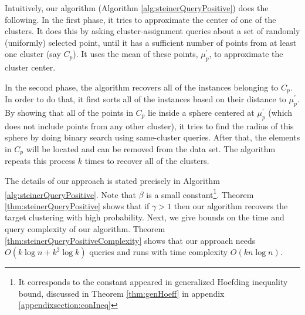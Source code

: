 \documentclass{article}
\begin{document}
Intuitively, our algorithm (Algorithm  \ref{alg:steinerQueryPositive}) does the following. In the first phase, it tries to approximate the center of one of the clusters. It does this by asking cluster-assignment queries about a set of randomly (uniformly) selected point, until it has a sufficient number of points from at least one cluster (say $C_p$). It uses the mean of these points, $\mu_p^\prime$, to approximate the cluster center. 

In the second phase, the algorithm recovers all of the instances belonging to $C_p$. In order to do that, it first sorts all of the instances based on their distance to $\mu_p^\prime$. By showing that all of the points in $C_p$ lie inside a sphere centered at $\mu_p^\prime$ (which does not include points from any other cluster), it tries to find the radius of this sphere by doing binary search using same-cluster queries. After that, the elements in $C_p$ will be located and can be removed from the data set. The algorithm repeats this process $k$ times to recover all of the clusters.



The details of our approach is stated precisely in Algorithm \ref{alg:steinerQueryPositive}. Note that $\beta$ is a small constant\footnote{It corresponds to the constant appeared in generalized Hoefding inequality bound, discussed in Theorem \ref{thm:genHoeff} in appendix \ref{appendixsection:conIneq}}. Theorem \ref{thm:steinerQueryPositive} shows that if $\gamma > 1$ then our algorithm recovers the target clustering with high probability. Next, we give bounds on the time and query complexity of our algorithm. Theorem \ref{thm:steinerQueryPositiveComplexity} shows that our approach needs $O(k\log n + k^2\log k)$ queries and runs with time complexity $O(kn\log n)$.
\end{document}
